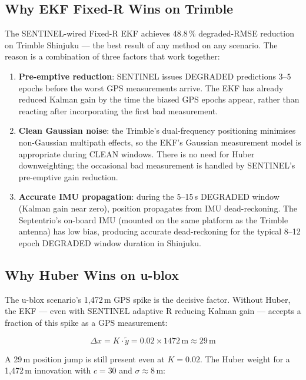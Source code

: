 \documentclass[12pt,a4paper]{article}
\begin{document}
\subsection{Why EKF Fixed-R Wins on Trimble}

The SENTINEL-wired Fixed-R EKF achieves 48.8\,\% degraded-RMSE reduction on Trimble
Shinjuku --- the best result of any method on any scenario.
The reason is a combination of three factors that work together:

\begin{enumerate}
  \item \textbf{Pre-emptive reduction}: SENTINEL issues DEGRADED predictions 3--5 epochs
    before the worst GPS measurements arrive.
    The EKF has already reduced Kalman gain by the time the biased GPS epochs appear,
    rather than reacting after incorporating the first bad measurement.

  \item \textbf{Clean Gaussian noise}: the Trimble's dual-frequency positioning minimises
    non-Gaussian multipath effects, so the EKF's Gaussian measurement model is appropriate
    during CLEAN windows.
    There is no need for Huber downweighting; the occasional bad measurement is handled
    by SENTINEL's pre-emptive gain reduction.

  \item \textbf{Accurate IMU propagation}: during the 5--15\,s DEGRADED window (Kalman
    gain near zero), position propagates from IMU dead-reckoning.
    The Septentrio's on-board IMU (mounted on the same platform as the Trimble antenna)
    has low bias, producing accurate dead-reckoning for the typical 8--12 epoch
    DEGRADED window duration in Shinjuku.
\end{enumerate}

\subsection{Why Huber Wins on u-blox}

The u-blox scenario's 1,472\,m GPS spike is the decisive factor.
Without Huber, the EKF --- even with SENTINEL adaptive R reducing Kalman gain ---
accepts a fraction of this spike as a GPS measurement:

\begin{equation}
  \Delta x = K \cdot \tilde{y} = 0.02 \times 1472\,\mathrm{m} \approx 29\,\mathrm{m}
\end{equation}

A 29\,m position jump is still present even at $K = 0.02$.
The Huber weight for a 1,472\,m innovation with $c = 30$ and $\sigma \approx 8$\,m:
\end{document}
